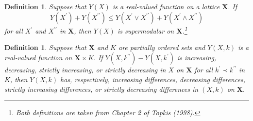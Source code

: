 \documentclass[notitlepage,onecolumn,11pt]{article}
\newtheorem{definition}[theorem]{Definition}
\begin{document}
\begin{definition}
Suppose that $Y(X)$ is a real-valued function on a lattice $\mathbf{X}.$ If%
\begin{equation}
Y(X^{\prime })+Y(X^{\prime \prime })\leq Y(X^{\prime }\vee X^{\prime \prime
})+Y(X^{\prime }\wedge X^{\prime \prime })  \label{Super}
\end{equation}%
for all $X^{\prime }$ and $X^{\prime \prime }$ in $\mathbf{X}$, then $Y(X)$
is supermodular on $\mathbf{X}$.\footnote{%
Both definitions are taken from Chapter 2 of Topkis (1998).}
\end{definition}

\begin{definition}
Suppose that $\mathbf{X}$ and $K$ are partially ordered sets and $Y(X,k)$ is
a real-valued function on $\mathbf{X}\times K.$ If $Y(X,k^{\prime \prime
})-Y(X,k^{\prime })$ is increasing, decreasing, strictly increasing, or
strictly decreasing in $X$ on $\mathbf{X}$ for all $k^{\prime }\prec
k^{\prime \prime }$ in $K$, then $Y(X,k)$ has, respectively, increasing
differences, decreasing differences, strictly increasing differences, or
strictly decreasing differences in $(X,k)$ on $\mathbf{X}.$
\end{definition}
\end{document}
